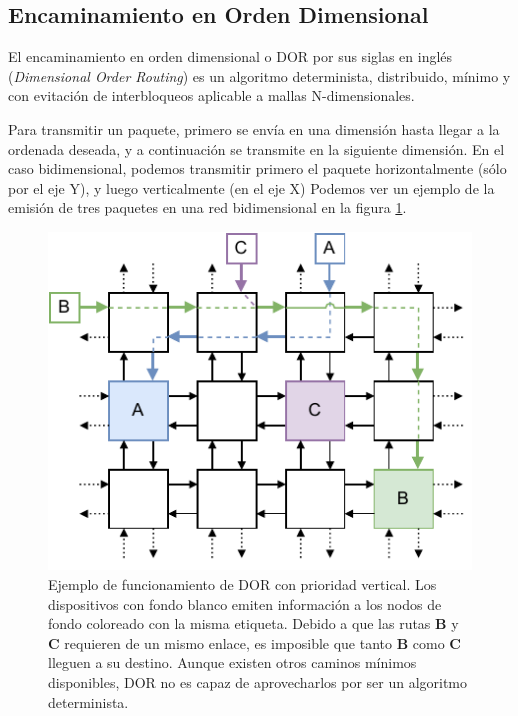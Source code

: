 \subsection{Encaminamiento en Orden Dimensional}
\label{subsec:dor}

El encaminamiento en orden dimensional o DOR por sus siglas en inglés (\textit{Dimensional Order Routing}) es un algoritmo determinista, distribuido, mínimo y con evitación de interbloqueos aplicable a mallas N-dimensionales.

Para transmitir un paquete, primero se envía en una dimensión hasta llegar a la ordenada deseada, y a continuación se transmite en la siguiente dimensión. En el caso bidimensional, podemos transmitir primero el paquete horizontalmente (sólo por el eje Y), y luego verticalmente (en el eje X) Podemos ver un ejemplo de la emisión de tres paquetes en una red bidimensional en la figura \ref{fig:dimensional_order_routing}.

\begin{figure}[h!tb]
    \centering
    \includegraphics{images/diagrams/dor.drawio.pdf}
    \caption[Ejemplo de funcionamiento del algoritmo de encaminamiento en orden dimensional]{Ejemplo de funcionamiento de DOR con prioridad vertical. Los dispositivos con fondo blanco emiten información a los nodos de fondo coloreado con la misma etiqueta. Debido a que las rutas \textbf{B} y \textbf{C} requieren de un mismo enlace, es imposible que tanto \textbf{B} como \textbf{C} lleguen a su destino. Aunque existen otros caminos mínimos disponibles, DOR no es capaz de aprovecharlos por ser un algoritmo determinista.}
    \label{fig:dimensional_order_routing}
\end{figure}

